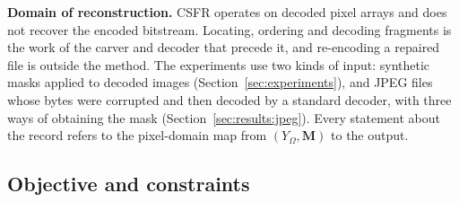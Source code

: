 \documentclass[final,3p]{elsarticle}
\begin{document}
\textbf{Domain of reconstruction.} CSFR operates on decoded pixel arrays and does not recover the encoded bitstream. Locating, ordering and decoding fragments is the work of the carver and decoder that precede it, and re-encoding a repaired file is outside the method. The experiments use two kinds of input: synthetic masks applied to decoded images (Section~\ref{sec:experiments}), and JPEG files whose bytes were corrupted and then decoded by a standard decoder, with three ways of obtaining the mask (Section~\ref{sec:results:jpeg}). Every statement about the record refers to the pixel-domain map from $(Y_{\Omega}, \mathbf{M})$ to the output.

\subsection{Objective and constraints}
\label{sec:problem:objective}
\end{document}
